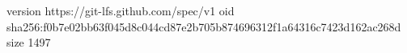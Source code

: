 version https://git-lfs.github.com/spec/v1
oid sha256:f0b7e02bb63f045d8c044cd87e2b705b874696312f1a64316c7423d162ac268d
size 1497
